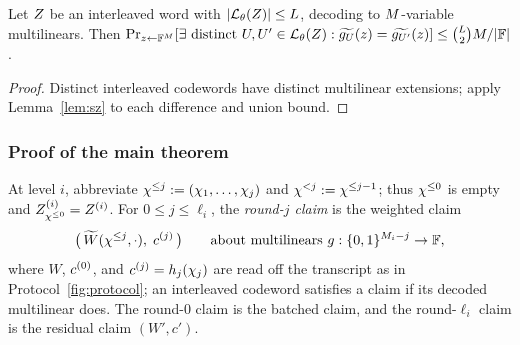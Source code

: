 \begin{lemma}\label{lem:ood}
Let $Z$ be an interleaved word with $|\mathcal{L}_\theta(Z)| \le L$, decoding to $M$-variable multilinears. Then $\Pr_{z \leftarrow \mathbb{F}^{M}}[\exists \text{ distinct } U, U' \in \mathcal{L}_\theta(Z) : \widetilde{g_U}(z) = \widetilde{g_{U'}}(z)] \le \binom{L}{2} M / |\mathbb{F}|$.
\end{lemma}

\begin{proof}
Distinct interleaved codewords have distinct multilinear extensions; apply Lemma~\ref{lem:sz} to each difference and union bound.
\end{proof}

\subsubsection{Proof of the main theorem}\label{pcs:proof}

At level $i$, abbreviate $\chi^{\le j} := (\chi_1, \dots, \chi_j)$ and $\chi^{<j} := \chi^{\le j-1}$; thus $\chi^{\le 0}$ is empty and $Z^{(i)}_{\chi^{\le 0}} = Z^{(i)}$. For $0 \le j \le \ell_i$, the \emph{round-$j$ claim} is the weighted claim
\[
\bigl(\, \widetilde{W}(\chi^{\le j}, \cdot),\; c^{(j)} \,\bigr) \qquad \text{about multilinears } g : \{0,1\}^{M_i - j} \to \mathbb{F},
\]
where $W$, $c^{(0)}$, and $c^{(j)} = h_j(\chi_j)$ are read off the transcript as in Protocol~\ref{fig:protocol}; an interleaved codeword satisfies a claim if its decoded multilinear does. The round-$0$ claim is the batched claim, and the round-$\ell_i$ claim is the residual claim $(W', c')$.

